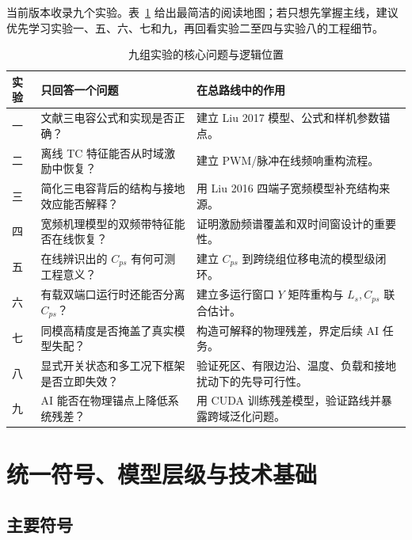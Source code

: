 \documentclass[UTF8,a4paper,12pt]{ctexart}
\begin{document}
当前版本收录九个实验。表~\ref{tab:experiment-map} 给出最简洁的阅读地图；若只想先掌握主线，建议优先学习实验一、五、六、七和九，再回看实验二至四与实验八的工程细节。

\begin{table}[H]
\centering
\caption{九组实验的核心问题与逻辑位置}
\label{tab:experiment-map}
\small
\begin{tabularx}{\textwidth}{p{}p{}X}
\toprule
实验 & 只回答一个问题 & 在总路线中的作用 \\
\midrule
一 & 文献三电容公式和实现是否正确？ & 建立 Liu 2017 模型、公式和样机参数锚点。\\
二 & 离线 TC 特征能否从时域激励中恢复？ & 建立 PWM/脉冲在线频响重构流程。\\
三 & 简化三电容背后的结构与接地效应能否解释？ & 用 Liu 2016 四端子宽频模型补充结构来源。\\
四 & 宽频机理模型的双频带特征能否在线恢复？ & 证明激励频谱覆盖和双时间窗设计的重要性。\\
五 & 在线辨识出的 $C_{ps}$ 有何可测工程意义？ & 建立 $C_{ps}$ 到跨绕组位移电流的模型级闭环。\\
六 & 有载双端口运行时还能否分离 $C_{ps}$？ & 建立多运行窗口 $Y$ 矩阵重构与 $L_s,C_{ps}$ 联合估计。\\
七 & 同模高精度是否掩盖了真实模型失配？ & 构造可解释的物理残差，界定后续 AI 任务。\\
八 & 显式开关状态和多工况下框架是否立即失效？ & 验证死区、有限边沿、温度、负载和接地扰动下的先导可行性。\\
九 & AI 能否在物理锚点上降低系统残差？ & 用 CUDA 训练残差模型，验证路线并暴露跨域泛化问题。\\
\bottomrule
\end{tabularx}
\end{table}

\section{统一符号、模型层级与技术基础}

\subsection{主要符号}
\end{document}
